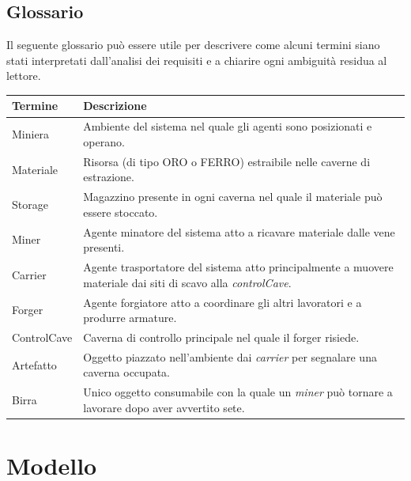\documentclass{llncs}
\newcommand{\labelsec}[1]{\label{sec:#1}}
\begin{document}
\subsection{Glossario}
Il seguente glossario può essere utile per descrivere come alcuni termini siano stati interpretati dall'analisi dei requisiti e a chiarire ogni ambiguità residua al lettore.\\ 
\begin{center}
    \begin{tabular}{ | l |  p{8cm} |}
    \hline
    \textbf{Termine} & \textbf{Descrizione} \\ \hline
    Miniera & Ambiente del sistema nel quale gli agenti sono posizionati e operano.\\ \hline
    Materiale & Risorsa (di tipo ORO o FERRO) estraibile nelle caverne di estrazione.\\ \hline
    Storage & Magazzino presente in ogni caverna nel quale il materiale può essere stoccato.\\ \hline
    Miner & Agente minatore del sistema atto a ricavare materiale dalle vene presenti. \\ \hline
    Carrier & Agente trasportatore del sistema atto principalmente a muovere materiale dai siti di scavo alla \textit{controlCave}. \\ \hline
    Forger & Agente forgiatore atto a coordinare gli altri lavoratori e a produrre armature. \\ \hline
    ControlCave & Caverna di controllo principale nel quale il forger risiede.\\ \hline
    Artefatto & Oggetto piazzato nell'ambiente dai \textit{carrier} per segnalare una caverna occupata. \\ \hline %
    Birra & Unico oggetto consumabile con la quale un \textit{miner} può tornare a lavorare dopo aver avvertito sete. \\ \hline
    \end{tabular}
\end{center}
\newpage
\section{Modello}
\labelsec{Modello}
\end{document}
